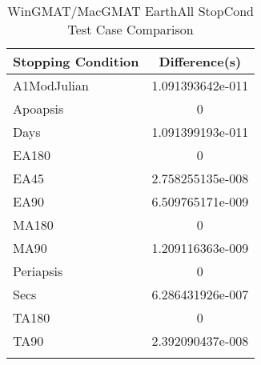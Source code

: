 \begin{table}[htbp!]
\centering
\caption{ WinGMAT/MacGMAT EarthAll StopCond Test Case Comparison}
      \begin{tabular}{lc}
      \hline\hline
          Stopping Condition & Difference(s) \\
         \hline
         A1ModJulian & 1.091393642e-011 \\
         Apoapsis & 0 \\
         Days & 1.091399193e-011 \\
         EA180 & 0 \\
         EA45 & 2.758255135e-008 \\
         EA90 & 6.509765171e-009 \\
         MA180 & 0 \\
         MA90 & 1.209116363e-009 \\
         Periapsis & 0 \\
         Secs & 6.286431926e-007 \\
         TA180 & 0 \\
         TA90 & 2.392090437e-008 \\
      \hline\hline
      \label{Table: WinGMAT-MacGMAT EarthAll StopCond Table} 
\end{tabular}
\end{table}
